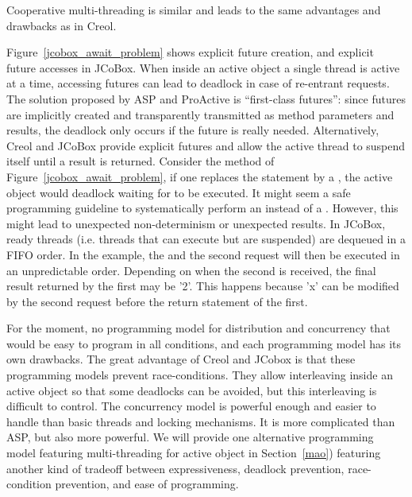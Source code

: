 Cooperative multi-threading is similar and leads to the same
advantages and drawbacks as  in Creol. 


Figure~\ref{jcobox_await_problem} shows explicit future creation, and
explicit future accesses in JCoBox.
When inside an active object a single thread is active at a time, accessing futures can lead to deadlock in case of re-entrant
requests. The solution proposed by ASP and ProActive is ``first-class
futures'': since futures are implicitly created and transparently
transmitted as method parameters and results, the deadlock only occurs
if the future is really needed.  Alternatively, Creol and JCoBox
provide explicit futures and allow the active thread to suspend itself
until a result is returned. Consider the method  of
Figure~\ref{jcobox_await_problem}, if one replaces the
 statement by a , the active object would deadlock waiting for
 to be executed. It might seem a safe programming guideline
to systematically perform an  instead of a .
However, this might lead to unexpected non-determinism or unexpected
results. In JCoBox, ready threads (i.e. threads that can execute but
are suspended) are dequeued in a FIFO order. In the
example, the  and the second  request will then be executed
in an unpredictable order. Depending on when the second
 is received, the final result returned by the first
 may be '2'. This happens because 'x' can be modified by
the second  request before the return statement of the
first.

\smallskip

For the moment, no programming model for distribution
and concurrency that would be easy to program in all conditions, and
each programming model has its own drawbacks. The great advantage of Creol and JCobox
is that these programming models prevent race-conditions. They allow
interleaving inside an active object so that some deadlocks
can be avoided, but this interleaving is difficult to control. The concurrency model is powerful enough and easier to
handle than basic threads and locking mechanisms. It is more
complicated than ASP, but also more powerful.
We will provide one
alternative programming model featuring multi-threading for active
object in Section~\ref{mao}) featuring another kind of tradeoff
between expressiveness, deadlock prevention, race-condition
prevention, and ease of programming. 



